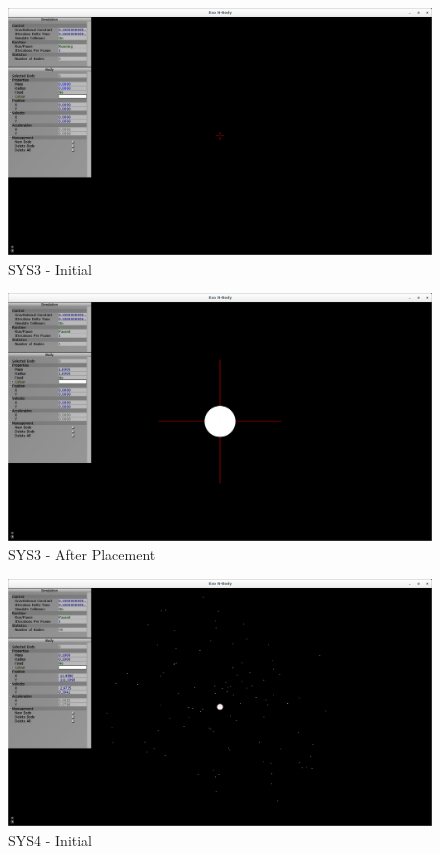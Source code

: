 \pagebreak



\begin{figure}[H]
  \centering
  \includegraphics[width=\textwidth]{img/testingEvidence/sys3_0.png}
  \caption{SYS3 - Initial}
\end{figure}

\begin{figure}[H]
  \centering
  \includegraphics[width=\textwidth]{img/testingEvidence/sys3_1.png}
  \caption{SYS3 - After Placement}
\end{figure}



\pagebreak

\begin{figure}[H]
  \centering
  \includegraphics[width=\textwidth]{img/testingEvidence/sys4_0.png}
  \caption{SYS4 - Initial}
\end{figure}

